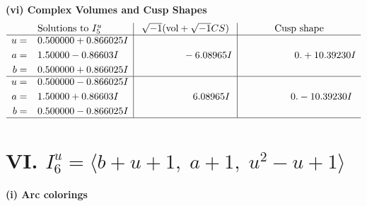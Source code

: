 \documentclass[1p]{elsarticle_modified}
\theoremstyle{definition}
\newcommand{\I}{\sqrt{-1}}
\begin{document}
\newpage\flushleft \textbf{(vi) Complex Volumes and Cusp Shapes}
$$\begin{array}{c|c|c}  
\text{Solutions to }I^u_{5}& \I (\text{vol} + \sqrt{-1}CS) & \text{Cusp shape}\\
 \hline 
\begin{aligned}
u &= \phantom{-}0.500000 + 0.866025 I \\
a &= \phantom{-}1.50000 - 0.86603 I \\
b &= \phantom{-}0.500000 + 0.866025 I\end{aligned}
 & \phantom{-0.000000 } -6.08965 I & \phantom{-0.000000 -}0. + 10.39230 I \\ \hline\begin{aligned}
u &= \phantom{-}0.500000 - 0.866025 I \\
a &= \phantom{-}1.50000 + 0.86603 I \\
b &= \phantom{-}0.500000 - 0.866025 I\end{aligned}
 & \phantom{-0.000000 -}6.08965 I & \phantom{-0.000000 } 0. - 10.39230 I\\
 \hline 
 \end{array}$$\newpage\newpage\renewcommand{\arraystretch}{1}
\centering \section*{VI. $I^u_{6}= \langle b+u+1,\;a+1,\;u^2- u+1 \rangle$}
\flushleft \textbf{(i) Arc colorings}\\
\end{document}
